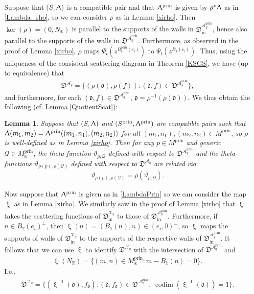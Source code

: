 \documentclass{amsart}
\DeclareMathOperator{\codim}{codim}
\DeclareMathOperator{\prin}{prin}
\DeclareMathOperator{\In}{in}
\let\bb=\mathbb
\let\f=\mathfrak
\let\s=\mathcal
\newcommand {\sQ} {\mathcal{Q}}
\renewcommand{\xi}{\upxi}
\renewcommand{\Lambda}{\Uplambda}
\theoremstyle{plain}%
\newtheorem{lem}[thm]{Lemma}
\theoremstyle{definition}
\theoremstyle{remark}
\begin{document}
Suppose that $(S,\Lambda)$ is a compatible pair and that $\Lambda^{\prin}$ is given by $\rho^* \Lambda$ as in \eqref{Lambda_rho}, so we can consider $\rho$ as in Lemma \ref{xirho}.  Then $\ker(\rho)=(0,N_{\bb{R}})$ is parallel to the supports of the walls in $\f{D}_{\In}^{\s{A}_q^{\prin}}$, hence also parallel to the supports of the walls in $\f{D}^{\s{A}_q^{\prin}}$.  
Furthermore, as observed in the proof of Lemma \ref{xirho}, $\rho$ maps $\Psi_t(z^{B^{\prin}_{1}(e_i)})$ to $\Psi_t(z^{B_1(e_i)})$.  Thus, using the uniqueness of the consistent scattering diagram in Theorem \ref{KSGS}, we have (up to equivalence) that
\begin{align}\label{rhoDA}
    \f{D}^{\s{A}_q}=\{(\rho(\f{d}),\rho(f))\colon (\f{d},f)\in \f{D}^{\s{A}_q^{\prin}}\},
\end{align}
and furthermore, for each $(\f{d},f)\in \f{D}^{\s{A}_q^{\prin}}$, $\f{d}=\rho^{-1}(\rho(\f{d}))$.  We thus obtain the following (cf. Lemma \ref{QuotientScat}): 


\begin{lem}\label{prin2A}
Suppose that $(S,\Lambda)$ and $(S^{\prin},\Lambda^{\prin})$ are compatible pairs such that $\Lambda(m_1,m_2)=\Lambda^{\prin}((m_1,n_1),(m_2,n_2))$ for all $(m_1,n_1),(m_2,n_2)\in M^{\prin}$, so $\rho$ is well-defined as in Lemma \ref{xirho}.  Then for any $p\in M^{\prin}$ and generic $\sQ\in M_{\bb{R}}^{\prin}$, the theta function $\vartheta_{p,\sQ}$ defined with respect to $\f{D}^{\s{A}_q^{\prin}}$ and the theta functions $\vartheta_{\rho(p),\rho(\sQ)}$ defined with respect to $\f{D}^{\s{A}_q}$ are related via
\begin{align*}
    \vartheta_{\rho(p),\rho(\sQ)}=\rho(\vartheta_{p,\sQ}).
\end{align*}
\end{lem}

Now suppose that $\Lambda^{\prin}$ is given as in \eqref{LambdaPrin} so we can consider the map $\xi$ as in Lemma \ref{xirho}. We similarly saw in the proof of Lemma \ref{xirho} that $\xi$ takes the scattering functions of $\f{D}_{\In}^{\s{X}_q}$ to those of $\f{D}_{\In}^{\s{A}_q^{\prin}}$.  Furthermore, if $n\in B_2(e_i)^{\perp}$, then $\xi(n)=(B_1(n),n)\in (e_i,0)^{\perp}$, so $\xi$ maps the supports of walls of $\f{D}_{\In}^{\s{X}_q}$ to the supports of the respective walls of $\f{D}_{\In}^{\s{A}_q^{\prin}}$.  It follows that we can use $\xi$ to identify $\f{D}^{\s{X}_q}$ with the intersection of $\f{D}^{\s{A}_q^{\prin}}$ and \begin{align}\label{xiN}
    \xi(N_{\bb{R}})=\{(m,n)\in M^{\prin}_{\bb{R}}\colon m-B_1(n)=0\}.
\end{align}
I.e.,
\begin{align}\label{xiDX}
    \f{D}^{\s{X}_{q}}=\{(\xi^{-1}(\f{d}),f_{\f{d}})\colon (\f{d},f_{\f{d}})\in \f{D}^{\s{A}_q^{\prin}},\medspace \codim(\xi^{-1}(\f{d}))=1\}.
\end{align}
\end{document}
